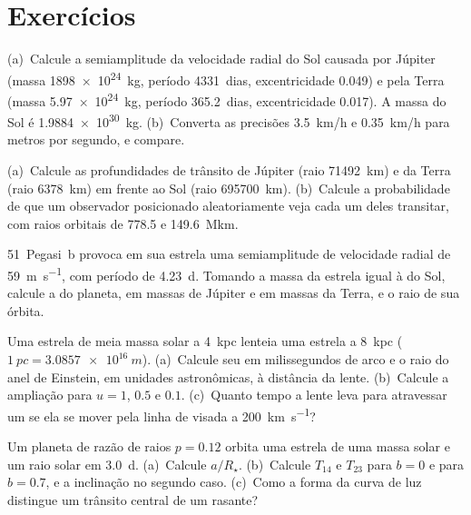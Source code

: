 \section*{Exercícios}

\begin{exercise}[$\star$]\label{exo:b3:exoplanets:1}
(a)~Calcule a semiamplitude da velocidade radial do Sol causada por
Júpiter (massa \qty{1898e24}{kg}, período \num{4331}~dias, excentricidade
0.049) e pela Terra (massa \qty{5.97e24}{kg}, período \num{365.2}~dias,
excentricidade 0.017). A massa do Sol é \qty{1.9884e30}{kg}.
(b)~Converta as precisões \qty{3.5}{km/h} e \qty{0.35}{km/h} para
metros por segundo, e compare.
\end{exercise}

\begin{exercise}[$\star$]\label{exo:b3:exoplanets:2}
(a)~Calcule as profundidades de trânsito de Júpiter (raio \qty{71492}{km}) e da
Terra (raio \qty{6378}{km}) em frente ao Sol (raio
\qty{695700}{km}). (b)~Calcule a probabilidade de que um observador posicionado
aleatoriamente veja cada um deles transitar, com raios orbitais de \num{778.5}
e \qty{149.6}{\mega km}.
\end{exercise}

\begin{exercise}[$\star$]\label{exo:b3:exoplanets:3}
51~Pegasi~b provoca em sua estrela uma semiamplitude de velocidade radial de
\qty{59}{m.s^{-1}}, com período de \qty{4.23}{d}. Tomando a massa da estrela
igual à do Sol, calcule a  do planeta, em massas de Júpiter
e em massas da Terra, e o raio de sua órbita.
\end{exercise}

\begin{exercise}[$\star$]\label{exo:b3:exoplanets:4}
Uma estrela de meia massa solar a \qty{4}{kpc} lenteia uma estrela a
\qty{8}{kpc} ($\qty{1}{pc} = \qty{3.0857e16}{m}$). (a)~Calcule seu
 em milissegundos de arco e o raio do anel de Einstein,
em unidades astronômicas, à distância da lente. (b)~Calcule a
ampliação para $u = 1$, $0.5$ e $0.1$. (c)~Quanto tempo a lente leva
para atravessar um  se ela se mover pela linha de visada a
\qty{200}{km.s^{-1}}?
\end{exercise}

\begin{exercise}[$\star\star$]\label{exo:b3:exoplanets:5}
Um planeta de razão de raios $p = 0.12$ orbita uma estrela de uma massa solar e
um raio solar em \qty{3.0}{d}. (a)~Calcule $a/R_\star$. (b)~Calcule
$T_{14}$ e $T_{23}$ para $b = 0$ e para $b = 0.7$, e a inclinação
no segundo caso. (c)~Como a forma da curva de luz distingue um
trânsito central de um rasante?
\end{exercise}

